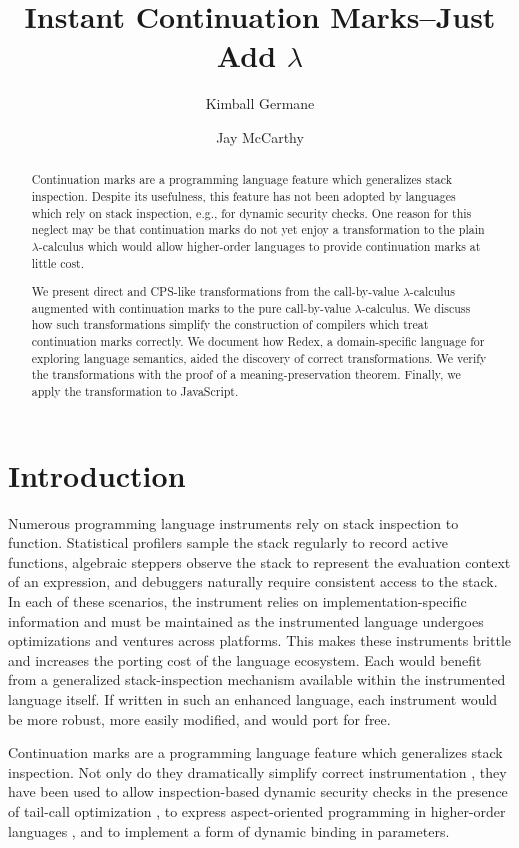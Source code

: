 \documentclass{llncs}
\title{Instant Continuation Marks--Just Add $\lambda$}
\author{Kimball Germane \and Jay McCarthy}
\institute{Brigham Young University, Provo, Utah}
\begin{document}
\maketitle

\begin{abstract}
Continuation marks are a programming language feature which generalizes stack inspection. Despite its usefulness, this feature has not been adopted by languages which rely on stack inspection, e.g., for dynamic security checks. One reason for this neglect may be that continuation marks do not yet enjoy a transformation to the plain $\lambda$-calculus which would allow higher-order languages to provide continuation marks at little cost.

We present direct and CPS-like transformations from the call-by-value $\lambda$-calculus augmented with continuation marks to the pure call-by-value $\lambda$-calculus. We discuss how such transformations simplify the construction of compilers which treat continuation marks correctly. We document how Redex, a domain-specific language for exploring language semantics, aided the discovery of correct transformations. We verify the transformations with the proof of a meaning-preservation theorem. Finally, we apply the transformation to JavaScript.
\end{abstract}

\section{Introduction}

Numerous programming language instruments rely on stack inspection to function. Statistical profilers sample the stack regularly to record active functions, algebraic steppers observe the stack to represent the evaluation context of an expression, and debuggers naturally require consistent access to the stack. In each of these scenarios, the instrument relies on implementation-specific information and must be maintained as the instrumented language undergoes optimizations and ventures across platforms. This makes these instruments brittle and increases the porting cost of the language ecosystem. Each would benefit from a generalized stack-inspection mechanism available within the instrumented language itself. If written in such an enhanced language, each instrument would be more robust, more easily modified, and would port for free.

Continuation marks \cite{clements2006portable} are a programming language feature which generalizes stack inspection. Not only do they dramatically simplify correct instrumentation \cite{clements2001modeling}, they have been used to allow inspection-based dynamic security checks in the presence of tail-call optimization \cite{clements2004tail}, to express aspect-oriented programming in higher-order languages \cite{tucker2003pointcuts}, and to implement a form of dynamic binding in parameters.
\end{document}

